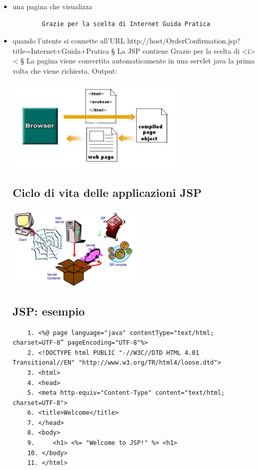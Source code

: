 \begin{itemize}
    \item una pagina che visualizza
    \begin{verbatim}
        Grazie per la scelta di Internet Guida Pratica
    \end{verbatim}
    \item quando l'utente si connette all'URL
http://host/OrderConfirmation.jsp?title=Internet+Guida+Pratica
§ La JSP contiene
Grazie per la scelta di <i> <%
§ La pagina viene convertita automaticamente in una servlet java la prima volta che viene richiesta.
Output:
\begin{center}
    \includegraphics[width=0.675\textwidth]{img/appWeb15.jpg}
\end{center}

\subsection{Ciclo di vita delle applicazioni JSP}
\begin{center}
    \includegraphics[width=0.5\textwidth]{img/appWeb16.jpg}
\end{center}

\subsection{JSP: esempio}
\begin{verbatim}
    1. <%@ page language="java" contentType="text/html; charset=UTF-8” pageEncoding="UTF-8"%>
    2. <!DOCTYPE html PUBLIC "-//W3C//DTD HTML 4.01 Transitional//EN" "http://www.w3.org/TR/html4/loose.dtd">
    3. <html>
    4. <head>
    5. <meta http-equiv="Content-Type" content="text/html; charset=UTF-8">
    6. <title>Welcome</title>
    7. </head>
    8. <body>
    9.     <h1> <%= "Welcome to JSP!" %> <h1>
    10. </body>
    11. </html>
\end{verbatim}


\end{itemize}
